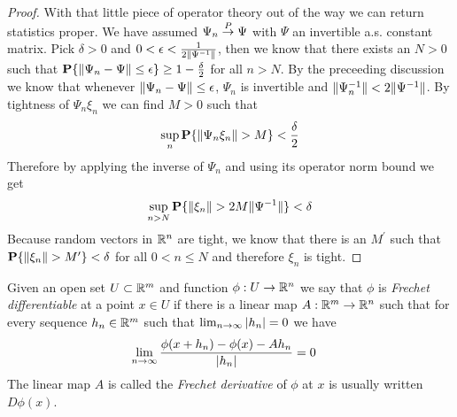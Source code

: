 \begin{proof}
With that little piece of operator theory out of the way we can return
statistics proper.  We have assumed $\Psi_n \overset{P}\to
\Psi$ with $\Psi$ an invertible a.s. constant matrix.  Pick $\delta > 0$ and $0
< \epsilon <
\frac{1}{2\lVert \Psi^{-1} \rVert}$, then we know that
there exists an $N > 0$ such that $\textbf{P}\{\lVert \Psi_n - \Psi \rVert \leq \epsilon\} \geq
1 - \frac{\delta}{2}$ for all $n > N$.  By the preceeding
discussion we know that whenever $\lVert \Psi_n - \Psi \rVert \leq \epsilon$,
  $\Psi_n$ is invertible and $\lVert \Psi_n^{-1} \rVert < 2 \lVert \Psi^{-1} \rVert$.  By
  tightness of $\Psi_n \xi_n$ we can find $M > 0$ such that 
\begin{align*}
\sup_n \textbf{P}\{\lVert \Psi_n \xi_n \rVert>M\} < \frac{\delta}{2}
\end{align*}
Therefore by applying the inverse of $\Psi_n$ and using
its operator norm bound we get
\begin{align*}
\sup_{n>N} \textbf{P}\{\lVert \xi_n \rVert>2M \lVert \Psi^{-1} \rVert\}< \delta
\end{align*} 
Because random vectors in $\mathbb{R}^n$ are tight, we know that there is
an $M^\prime$ such that $\textbf{P}\{\lVert \xi_n \rVert>M^\prime\} < \delta$ for all $0 < n \leq N$ and
therefore $\xi_n$ is tight.
\end{proof}

\begin{defn}Given an open set $U \subset \mathbb{R}^m$ and function $\phi :
  U\to \mathbb{R}^n$  we say that $\phi$ is \emph{Frechet differentiable} at a
  point $x\in U$ if there is a linear map $A : \mathbb{R}^m \to
  \mathbb{R}^n$ such that for every sequence $h_n \in \mathbb{R}^m$ such that
$\lim_{n \to \infty} \left \vert h_n \right \vert = 0$ we have 
\begin{align*}
\lim_{n \to \infty}
  \frac{\phi(x + h_n) - \phi(x) - A h_n}{\left \vert h_n \right \vert} &= 0 
\end{align*}
The linear map $A$ is called the \emph{Frechet derivative} of $\phi$
at $x$ is usually written $D\phi(x)$.
\end{defn}

